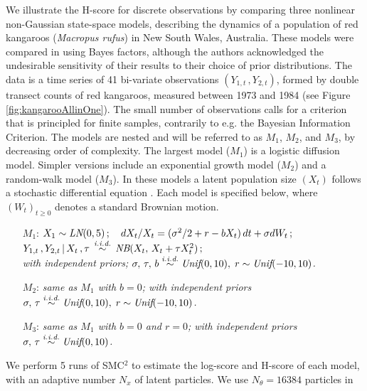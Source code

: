 \documentclass[12pt]{article}
\theoremstyle{plain}
\theoremstyle{definition}
\begin{document}
	We illustrate the H-score for discrete observations
	by comparing three nonlinear non-Gaussian state-space models, describing the
	dynamics of a population of red kangaroos (\emph{Macropus rufus}) in New South
	Wales, Australia. These models were compared in \citet{knape2012} using Bayes
	factors, although the authors acknowledged the undesirable sensitivity of their
	results to their choice of prior distributions. The data
	\citep[][]{caughley1981} is a time series of 41 bi-variate observations
	$(Y_{1,t}\,,Y_{2,t})$, formed by double transect counts of red kangaroos,
	measured between
	1973 and 1984 (see Figure \ref{fig:kangarooAllinOne}). 
	The small number of observations calls for a criterion
	that is principled for finite samples, contrarily to e.g. the Bayesian Information Criterion.
	The models are nested
	and will be referred to as $M_1$, $M_2$, and $M_3$, by decreasing order of
	complexity. The largest model ($M_1$) is a logistic diffusion model. Simpler
	versions include an exponential growth model ($M_2$) and a random-walk model
	($M_3$). In these models a latent population size $(X_t)$ follows a
	stochastic differential equation \citep[see motivation in][]{dennis1988,knape2012}. 
	Each model is specified  below, where $(W_t)_{t\geq 0}$ denotes a standard Brownian motion. 
	{\small
		\begin{itemize}
			\item [$M_1$:]\textit{$X_1 \sim \emph{\text{LN}}(0,5) \,;\quad  dX_t/X_t=(\sigma^2/2+r-bX_t)\,dt+\sigma dW_t \,;$
				\\
				$Y_{1,t}\,,Y_{2,t}\,|\,X_t\,,\tau\,\stackrel{\emph{\text{i.i.d.}}}{\sim}\,\emph{\text{NB}}(X_t,\,X_t+\tau X_t^2)\,;$
				\\
				with independent priors; $\sigma,\,\tau,\,b \stackrel{\emph{\text{i.i.d.}}}{\sim} \emph{\text{Unif}}(0,10),\;r\sim\emph{\text{Unif}}(-10,10)$.}
			\item [$M_2$:]\textit{same as $M_1$ with $b=0$; with independent priors $\sigma,\,\tau \stackrel{\emph{\text{i.i.d.}}}{\sim} \emph{\text{Unif}}(0,10),\;r\sim\emph{\text{Unif}}(-10,10)$.}
			\item [$M_3$:]\textit{same as $M_1$ with $b=0$ and $r=0$; with independent priors $\sigma,\,\tau \stackrel{\emph{\text{i.i.d.}}}{\sim} \emph{\text{Unif}}(0,10)$.}
		\end{itemize}
	}
	We perform 5 runs of SMC$^2$
	to estimate the log-score and H-score of
	each model, with an adaptive number $N_x$ of latent particles. We use $N_\theta =16384$ particles in
\end{document}
